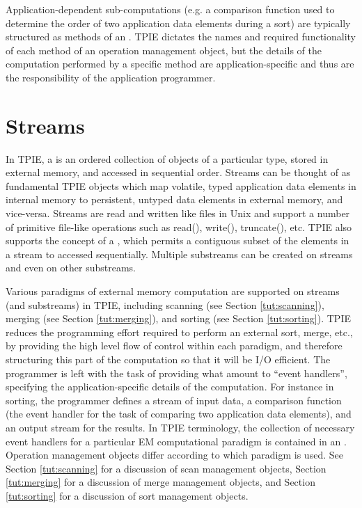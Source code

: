 Application-dependent sub-computations (e.g. a comparison
function used to determine the order of two application data
elements during a sort) are typically structured as methods
of an . TPIE dictates the
names and required functionality of each method of an
operation management object, but the details of the
computation performed by a specific method are
application-specific and thus are the responsibility of the
application programmer. 


\section{Streams}


In TPIE, a  is an ordered collection of objects
of a particular type, stored in external memory, and
accessed in sequential order. Streams can be thought of as
fundamental TPIE objects which map volatile, typed
application data elements in internal
memory to persistent, untyped data elements in external
memory, and vice-versa.  Streams are read and written like
files in Unix and support a number of primitive file-like
operations such as read(), write(), truncate(), etc. 
TPIE also supports the concept of a , which
permits a contiguous subset of the elements in a stream to
accessed sequentially. Multiple substreams can be created on
streams and even on other substreams. 

Various paradigms of external memory computation are
supported on streams (and substreams) in TPIE, including
scanning (see Section \ref{tut:scanning}), merging (see
Section \ref{tut:merging}), and sorting (see Section
\ref{tut:sorting}). TPIE reduces the programming effort
required to perform an external sort, merge, etc., by
providing the high level flow of control within each
paradigm, and therefore structuring this part of the
computation so that it will be I/O efficient. The programmer
is left with the task of providing what amount to ``event
handlers'', specifying the application-specific details of
the computation. For instance in sorting, the programmer
defines a stream of input data, a comparison function (the
event handler for the task of comparing two application data
elements), and an output stream for the results. In TPIE
terminology, the collection of necessary event handlers for
a particular EM computational paradigm is contained in an
. Operation management objects differ
according to which paradigm is used.  See Section
\ref{tut:scanning} for a discussion of scan management
objects, Section \ref{tut:merging} for a discussion of merge
management objects, and Section \ref{tut:sorting} for a
discussion of sort management objects.

